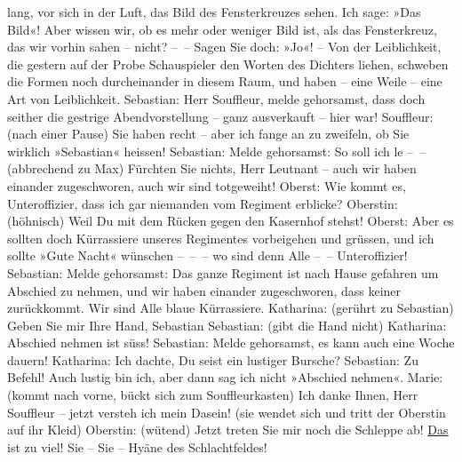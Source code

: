 					lang, vor sich in der Luft, das Bild des Fensterkreuzes sehen. Ich sage: »Das
					Bild«! Aber wissen wir, ob es mehr oder weniger Bild ist, als das Fensterkreuz,
					das wir vorhin sahen – nicht? – – Sagen Sie doch: »Jo«! – Von der
					Leiblichkeit, die gestern auf der Probe Schauspieler den Worten des Dichters
					liehen, schweben die Formen noch durcheinander in diesem Raum, und haben – eine
					Weile – eine Art von Leiblichkeit.\pend
           \pstart
           Sebastian: Herr Souffleur, melde gehorsamst, dass doch seither die gestrige
					Abendvorstellung – ganz ausverkauft – hier war!\pend
           \pstart
           Souffleur: (nach einer Pause) Sie haben recht – aber ich fange an zu zweifeln, ob
					Sie wirklich »Sebastian« heissen!\pend
           \pstart
           Sebastian: Melde gehorsamst: So soll ich le – – (abbrechend zu Max) Fürchten
					Sie nichts, Herr Leutnant – auch wir haben einander zugeschworen, auch wir sind
					totgeweiht!\pend
           \pstart
           Oberst: Wie kommt es, Unteroffizier, dass ich gar niemanden vom Regiment
					erblicke?\pend
           \pstart
           Oberstin: (höhnisch) Weil Du mit dem Rücken gegen den Kasernhof stehst!\pend
           \pstart
           Oberst: Aber es sollten doch Kürrassiere unseres Regimentes vorbeigehen und
					grüssen, und ich sollte »Gute Nacht« wünschen – – – wo sind denn Alle
					– – Unteroffizier!\pend
           \pstart
           Sebastian: Melde gehorsamst: Das ganze Regiment ist nach Hause gefahren um
					Abschied zu nehmen, und wir haben einander {\pb}zugeschworen, dass keiner
					zurückkommt. Wir sind Alle blaue Kürrassiere.\pend
           \pstart
           Katharina: (gerührt zu Sebastian) Geben Sie mir Ihre Hand, Sebastian\pend
           \pstart
           Sebastian: (gibt die Hand nicht)\pend
           \pstart
           Katharina: Abschied nehmen ist süss!\pend
           \pstart
           Sebastian: Melde gehorsamst, es kann auch eine Woche dauern!\pend
           \pstart
           Katharina: Ich dachte, Du seist ein lustiger Bursche?\pend
           \pstart
           Sebastian: Zu Befehl! Auch lustig bin ich, aber dann sag ich nicht »Abschied
					nehmen«.\pend
           \pstart
           Marie: (kommt nach vorne, bückt sich zum Souffleurkasten) Ich danke Ihnen, Herr
					Souffleur – jetzt versteh ich mein Dasein! (sie wendet sich und tritt der
					Oberstin auf ihr Kleid)\pend
           \pstart
           Oberstin: (wütend) Jetzt treten Sie mir noch die Schleppe ab! \uline{Das} ist zu viel! Sie – Sie – Hyäne des
					Schlachtfeldes!\pend

